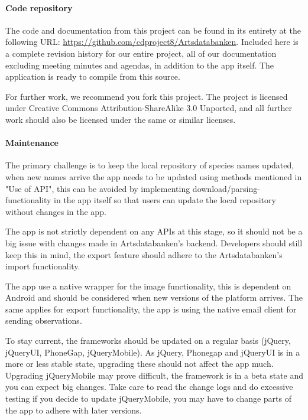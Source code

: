 \paragraph{Code repository}\hspace{1mm}\newline

The code and documentation from this project can be found in its entirety at
the following URL: \url{https://github.com/cdproject8/Artsdatabanken}. Included
here is a complete revision history for our entire project, all of our
documentation excluding meeting minutes and agendas, in addition to the app
itself. The application is ready to compile from this source.

For further work, we recommend you fork this project. The project is licensed
under Creative Commons Attribution-ShareAlike 3.0 Unported, and all further
work should also be licensed under the same or similar licenses.

\paragraph{Maintenance}\hspace{1mm}\newline

The primary challenge is to keep the local repository of species names updated,
when new names arrive the app needs to be updated using methods mentioned in
"Use of API", this can be avoided by implementing download/parsing-functionality
in the app itself so that users can update the local repository without changes
in the app. 

The app is not strictly dependent on any APIs at this stage, so it
should not be a big issue with changes made in Artsdatabanken's backend.
Developers should still keep this in mind, the export feature should adhere to
the Artsdatabanken's import functionality. 

The app use a native wrapper for the image functionality, this is dependent on
Android and should be considered when new versions of the platform arrives. The
same applies for export functionality, the app is using the native email client for
sending observations.

To stay current, the frameworks should be updated on a regular basis (jQuery,
jQueryUI, PhoneGap, jQueryMobile). As jQuery, Phonegap and jQueryUI is in a more
or less stable state, upgrading these should not affect the app much. Upgrading
jQueryMobile may prove difficult, the framework is in a beta state and you
can expect big changes. Take care to read the change logs and do excessive
testing if you decide to update jQueryMobile, you may have to change parts of
the app to adhere with later versions.
